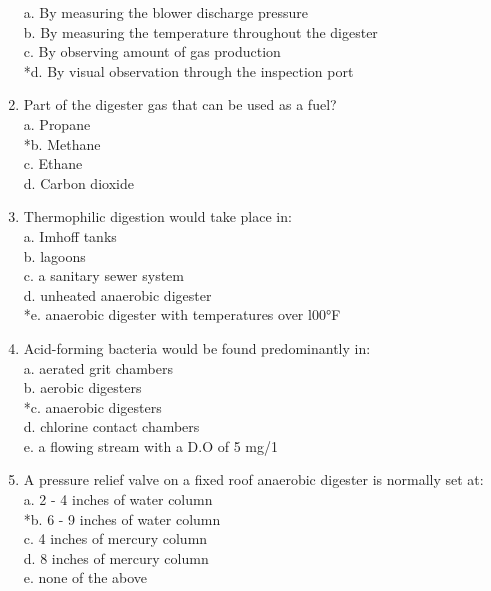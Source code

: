 \documentclass{article}
\begin{document}
\begin{enumerate}
a. By measuring the blower discharge pressure \\
b. By measuring the temperature throughout the digester \\
c. By observing amount of gas production \\
*d. By visual observation through the inspection port \\

\item  Part of the digester gas that can be used as a fuel? \\

a. Propane \\
*b. Methane \\
c. Ethane \\
d. Carbon dioxide \\

\item  Thermophilic digestion would take place in: \\

a. Imhoff tanks \\
b. lagoons \\
c. a sanitary sewer system \\
d. unheated anaerobic digester \\
*e. anaerobic digester with temperatures over l00°F \\

\item  Acid-forming bacteria would be found predominantly in: \\

a. aerated grit chambers \\
b. aerobic digesters \\
*c. anaerobic digesters \\
d. chlorine contact chambers \\
e. a flowing stream with a D.O of 5 mg/1 \\

\item  A pressure relief valve on a fixed roof anaerobic digester is normally set at: \\

a. 2 - 4 inches of water column \\
*b. 6 - 9 inches of water column \\
c. 4 inches of mercury column \\
d. 8 inches of mercury column \\
e. none of the above \\


\end{enumerate}
\end{document}
